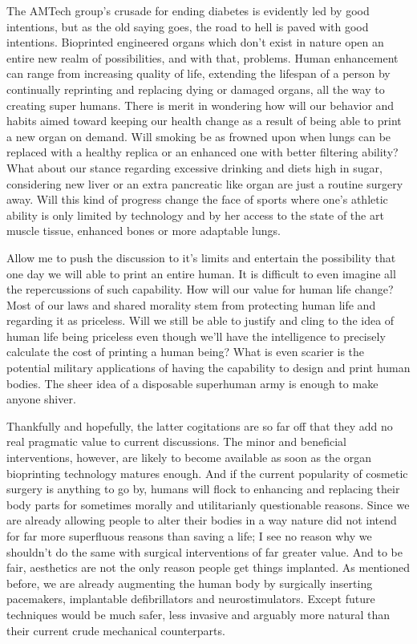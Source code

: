 \documentclass[12pt]{article} %
\begin{document}
The AMTech group's crusade for ending diabetes is evidently led by good intentions, but as the old saying goes, the road to hell is paved with good intentions. Bioprinted engineered organs which don't exist in nature open an entire new realm of possibilities, and with that, problems. 
Human enhancement can range from increasing quality of life, extending the lifespan of a person by continually reprinting and replacing dying or damaged organs, all the way to creating super humans. There is merit in wondering how will our behavior and habits aimed toward keeping our health change as a result of being able to print a new organ on demand. Will smoking be as frowned upon when lungs can be replaced with a healthy replica or an enhanced one with better filtering ability? What about our stance regarding excessive drinking and diets high in sugar, considering new liver or an extra pancreatic like organ are just a routine surgery away. Will this kind of progress change the face of sports where one's athletic ability is only limited by technology and by her access to the state of the art muscle tissue, enhanced bones or more adaptable lungs.

Allow me to push the discussion to it's limits and entertain the possibility that one day we will able to print an entire human. It is difficult to even imagine all the repercussions of such capability. How will our value for human life change? Most of our laws and shared morality stem from protecting human life and regarding it as priceless. Will we still be able to justify and cling to the idea of human life being priceless even though we'll have the intelligence to precisely calculate the cost of printing a human being? What is even scarier is the potential military applications of having the capability to design and print human bodies. The sheer idea of a disposable superhuman army is enough to make anyone shiver.
 
Thankfully and hopefully, the latter cogitations are so far off that they add no real pragmatic value to current discussions. 
The minor and beneficial interventions, however, are likely to become available as soon as the organ bioprinting technology matures enough. And if the current popularity of cosmetic surgery is anything to go by, humans will flock to enhancing and replacing their body parts for sometimes morally and utilitarianly questionable reasons. Since we are already allowing people to alter their bodies in a way nature did not intend for far more superfluous reasons than saving a life; I see no reason why we shouldn't do the same with surgical interventions of far greater value. And to be fair, aesthetics are not the only reason people get things implanted. As mentioned before, we are already augmenting the human body by surgically inserting pacemakers, implantable defibrillators and neurostimulators. Except future techniques would be much safer, less invasive and arguably more natural than their current crude mechanical counterparts.
\end{document}
